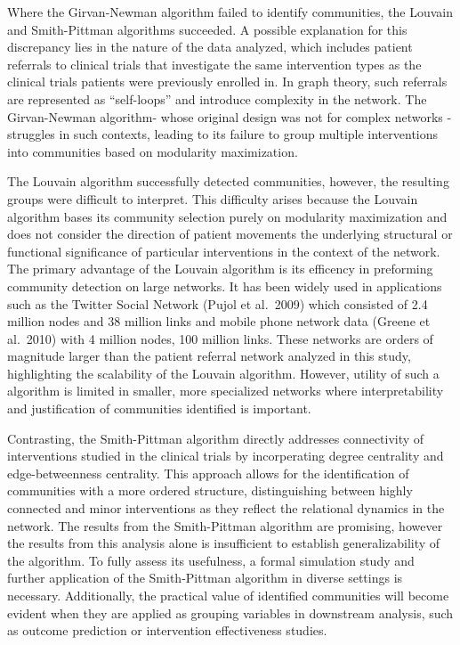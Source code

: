 \documentclass{article}
\begin{document}
Where the Girvan-Newman algorithm failed to identify communities, the
Louvain and Smith-Pittman algorithms succeeded. A possible explanation
for this discrepancy lies in the nature of the data analyzed, which
includes patient referrals to clinical trials that investigate the same
intervention types as the clinical trials patients were previously
enrolled in. In graph theory, such referrals are represented as
``self-loops'' and introduce complexity in the network. The
Girvan-Newman algorithm- whose original design was not for complex
networks - struggles in such contexts, leading to its failure to group
multiple interventions into communities based on modularity
maximization.

The Louvain algorithm successfully detected communities, however, the
resulting groups were difficult to interpret. This difficulty arises
because the Louvain algorithm bases its community selection purely on
modularity maximization and does not consider the direction of patient
movements the underlying structural or functional significance of
particular interventions in the context of the network. The primary
advantage of the Louvain algorithm is its efficency in preforming
community detection on large networks. It has been widely used in
applications such as the Twitter Social Network (Pujol et al.~2009)
which consisted of 2.4 million nodes and 38 million links and mobile
phone network data (Greene et al.~2010) with 4 million nodes, 100
million links. These networks are orders of magnitude larger than the
patient referral network analyzed in this study, highlighting the
scalability of the Louvain algorithm. However, utility of such a
algorithm is limited in smaller, more specialized networks where
interpretability and justification of communities identified is
important.

Contrasting, the Smith-Pittman algorithm directly addresses connectivity
of interventions studied in the clinical trials by incorperating degree
centrality and edge-betweenness centrality. This approach allows for the
identification of communities with a more ordered structure,
distinguishing between highly connected and minor interventions as they
reflect the relational dynamics in the network. The results from the
Smith-Pittman algorithm are promising, however the results from this
analysis alone is insufficient to establish generalizability of the
algorithm. To fully assess its usefulness, a formal simulation study and
further application of the Smith-Pittman algorithm in diverse settings
is necessary. Additionally, the practical value of identified
communities will become evident when they are applied as grouping
variables in downstream analysis, such as outcome prediction or
intervention effectiveness studies.
\end{document}
